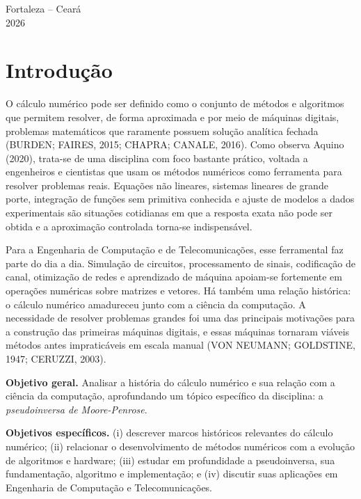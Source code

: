 \documentclass[12pt,a4paper,oneside]{report}
\begin{document}
\vfill
\begin{center}{\normalsize Fortaleza -- Ceará\\ 2026}\end{center}
\clearpage

\thispagestyle{empty}
{\singlespacing
\renewcommand{\contentsname}{\centerline{\normalfont\large\bfseries SUMÁRIO}}
\tableofcontents}
\thispagestyle{empty}
\clearpage

\pagestyle{fancy}
\chapter*{Introdução}

O cálculo numérico pode ser definido como o conjunto de métodos e algoritmos que permitem
resolver, de forma aproximada e por meio de máquinas digitais, problemas matemáticos que
raramente possuem solução analítica fechada (BURDEN; FAIRES, 2015; CHAPRA; CANALE, 2016). Como observa Aquino (2020), trata-se de uma
disciplina com foco bastante prático, voltada a engenheiros e cientistas que usam os
métodos numéricos como ferramenta para resolver problemas reais. Equações não
lineares, sistemas lineares de grande porte, integração de funções sem primitiva conhecida e
ajuste de modelos a dados experimentais são situações cotidianas em que a resposta exata não
pode ser obtida e a aproximação controlada torna-se indispensável.

Para a Engenharia de Computação e de Telecomunicações, esse ferramental faz parte do dia a dia. Simulação de circuitos, processamento de sinais, codificação de canal, otimização de redes e aprendizado de máquina apoiam-se fortemente em operações numéricas sobre matrizes e vetores. Há também uma relação histórica: o cálculo numérico amadureceu junto com a ciência da computação. A necessidade de resolver problemas grandes foi uma das principais motivações para a construção das primeiras máquinas digitais, e essas máquinas tornaram viáveis métodos antes impraticáveis em escala manual (VON NEUMANN; GOLDSTINE, 1947; CERUZZI, 2003).

\noindent\textbf{Objetivo geral.} Analisar a história do cálculo numérico e sua relação com a
ciência da computação, aprofundando um tópico específico da disciplina: a \emph{pseudoinversa
de Moore-Penrose}.

\noindent\textbf{Objetivos específicos.} (i) descrever marcos históricos relevantes do cálculo
numérico; (ii) relacionar o desenvolvimento de métodos numéricos com a evolução de algoritmos
e hardware; (iii) estudar em profundidade a pseudoinversa, sua fundamentação, algoritmo e
implementação; e (iv) discutir suas aplicações em Engenharia de Computação e Telecomunicações.
\end{document}
